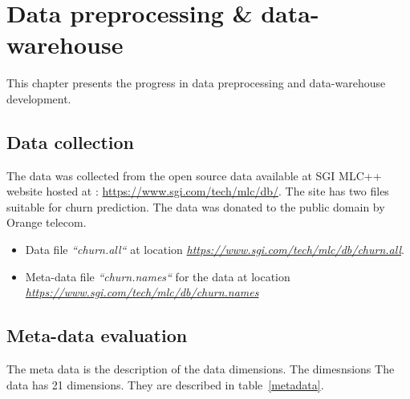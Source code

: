 \setlength{\footskip}{8mm}

\chapter{Data preprocessing \& data-warehouse}
\label{ch:dpdd}
This chapter presents the progress in data preprocessing and data-warehouse development.

\section{Data collection}
The data was collected from the open source data available at SGI MLC++ website hosted at : \url{https://www.sgi.com/tech/mlc/db/}. The site has two files suitable for churn prediction. The data was donated to the public domain by Orange telecom.
\begin{itemize}
	\item Data file \textit{``churn.all``} at location  \textit{\url{https://www.sgi.com/tech/mlc/db/churn.all}}.
	\item Meta-data file \textit{``churn.names``} for the data at location \textit{\url{https://www.sgi.com/tech/mlc/db/churn.names}}
\end{itemize}

\section{Meta-data evaluation}

The meta data is the description of the data dimensions. The dimesnsions 
The data has 21 dimensions. They are described in table~\ref{metadata}.

